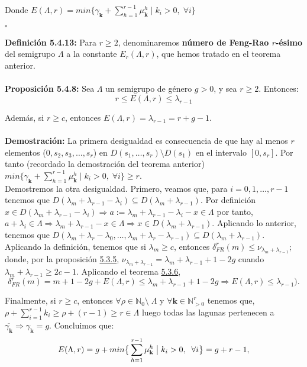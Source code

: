\documentclass[11pt,spanish]{book}
\newcommand{\qed}{\begin{flushright} $\square$ \end{flushright}}
\newcommand{\fr}{\delta_{FR}^{r}(m)}
\newcommand{\la}{\lambda}
\begin{document}
Donde $E(\Lambda,r)=min\{\gamma_{\mathbf{k}}+\sum_{h=1}^{r-1}\mu_{\mathbf{k}}^h\;|\;k_i>0,\;\forall i\}$
\qed
\textbf{Definición 5.4.13: } Para $r\geq 2$, denominaremos \textbf{número de Feng-Rao $r$-ésimo} del semigrupo $\Lambda$ a la constante $E_r(\Lambda,r)$, que hemos tratado en el teorema anterior.\\
\\ \textbf{Proposición 5.4.8: } Sea $\Lambda$ un semigrupo de género $g>0$, y sea $r\geq 2$. Entonces:
$$r\leq E(\Lambda,r)\leq \lambda_{r-1}$$

Además, si $r\geq c$, entonces $E(\Lambda,r)=\lambda_{r-1}=r+g-1$.\\
\\ \textbf{Demostración:}
La primera desigualdad es consecuencia de que hay al menos $r$ elementos ($0,s_2,s_3,\ldots,s_r$) en $D(s_1,\ldots,s_r)\setminus D(s_1)$ en el intervalo $[0,s_r]$. Por tanto (recordado la demostración del teorema anterior) $min\{\gamma_{\mathbf{k}}+\sum_{h=1}^{r-1}\mu_{\mathbf{k}}^h\;|\;k_i>0,\;\forall i\}\geq r$.\\
 Demostremos la otra desigualdad. Primero, veamos que, para $i=0,1,\ldots,r-1$ tenemos que $D(\la_m+\la_{r-1}-\la_i)\subseteq D(\la_m+\la_{r-1})$. Por definición $x\in D(\la_m+\la_{r-1}-\la_i)\Rightarrow a:=\la_m+\la_{r-1}-\la_i-x\in \Lambda$ por tanto, $a+\la_i\in \Lambda\Rightarrow \la_m+\la_{r-1}-x\in \Lambda\Rightarrow x\in D(\la_m+\la_{r-1})$.
 Aplicando lo anterior, tenemos que $D(\la_m+\la_r-\la_0,\ldots,\la_m+\la_r-\la_{r-1})\subseteq D(\la_m+\la_{r-1})$.
 Aplicando la definición, tenemos que si $\la_m\geq c$, entonces $\fr\leq \nu_{\la_{m}+\la_{r-1}}$; donde, por la proposición \hyperlink{prop5.4.6}{5.3.5}, $\nu_{\la_{m} +\la_{r-1}}=\la_m+\la_{r-1}+1-2g$  cuando $\la_m+\la_{r-1}\geq 2c-1$. Aplicando el teorema \hyperlink{prop5.4.7}{5.3.6},
 $$\fr=m+1-2g+E(\Lambda,r)\leq \la_m+\la_{r-1}+1-2g\Rightarrow E(\Lambda,r)\leq \la_{r-1}).$$

 Finalmente, si $r\geq c$, entonces $\forall \rho \in \mathbb{N}_0\setminus\; \Lambda$ y $\forall\mathbf{k}\in\mathbb{N}_{>0}^r$ tenemos que, $\rho+\sum_{i=1}^{r-1}k_{i}\geq \rho + (r-1)\geq r\in \Lambda$ luego todas las lagunas pertenecen a $\overline{\gamma_{\mathbf{k}}}\Rightarrow \gamma_{\mathbf{k}}=g$. Concluimos que:
 $$E(\Lambda,r)=g+min\big{\{}\sum_{h=1}^{r-1}\mu_{\mathbf{k}}^h\;\big{|}\;k_i>0,\;\;\forall i\big{\}}=g+r-1,$$
    
\end{document}

